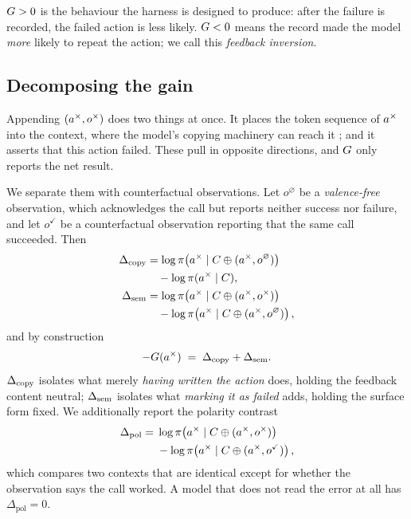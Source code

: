 $G > 0$ is the behaviour the harness is designed to produce: after the
failure is recorded, the failed action is less likely. $G < 0$ means the
record made the model \emph{more} likely to repeat the action; we call this
\emph{feedback inversion}.

\subsection{Decomposing the gain}

Appending $(a^{\times}, o^{\times})$ does two things at once. It places the token
sequence of $a^{\times}$ into the context, where the model's copying machinery can
reach it \citep{olsson2022induction,xu2022breaktheloop}; and it asserts that this
action failed. These pull in opposite directions, and $G$ only reports the
net result.

We separate them with counterfactual observations. Let $o^{\varnothing}$ be a
\emph{valence-free} observation, which acknowledges the call but reports neither
success nor failure, and let $o^{\checkmark}$ be a counterfactual observation
reporting that the same call succeeded. Then
\begin{align}
\Delta_{\mathrm{copy}} &= \log \pi\!\left(a^{\times} \mid C \oplus (a^{\times}, o^{\varnothing})\right) \notag \\
          &\quad - \log \pi(a^{\times} \mid C), \label{eq:copy}\\
\Delta_{\mathrm{sem}}  &= \log \pi\!\left(a^{\times} \mid C \oplus (a^{\times}, o^{\times})\right) \notag \\
          &\quad - \log \pi\!\left(a^{\times} \mid C \oplus (a^{\times}, o^{\varnothing})\right), \label{eq:sem}
\end{align}
and by construction
\begin{equation}
-G(a^{\times}) \;=\; \Delta_{\mathrm{copy}} + \Delta_{\mathrm{sem}} .
\label{eq:decomp}
\end{equation}
$\Delta_{\mathrm{copy}}$ isolates what merely \emph{having written the action} does, holding
the feedback content neutral; $\Delta_{\mathrm{sem}}$ isolates what \emph{marking it as
failed} adds, holding the surface form fixed. We additionally report the
polarity contrast
\begin{equation}
\begin{split}
\Delta_{\mathrm{pol}} = {}& \log \pi\!\left(a^{\times} \mid C \oplus (a^{\times}, o^{\times})\right) \\
                        & - \log \pi\!\left(a^{\times} \mid C \oplus (a^{\times}, o^{\checkmark})\right),
\end{split}
\label{eq:pol}
\end{equation}
which compares two contexts that are identical except for whether the
observation says the call worked. A model that does not read the error at all
has $\Delta_{\mathrm{pol}} = 0$.

